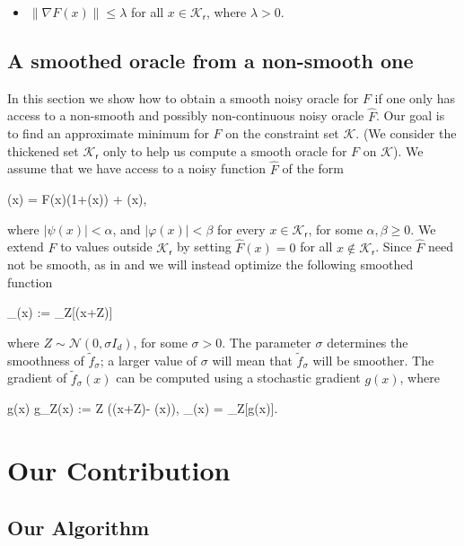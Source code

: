 \documentclass[final,12pt]{colt2018} %
\def \be{\begin{equs}}
\def \ee{\end{equs}}
\begin{document}
{\begin{itemize}
\item $\| \nabla F(x) \| \leq \lambda $ for all $x \in \mathcal{K}_{\mathsf{r}}$, where $\lambda>0$.

%


\end{itemize}


\subsection{A smoothed oracle from a non-smooth one} \label{sec:smoothed_from_nonsmooth}

In this section we show how to obtain a smooth noisy oracle for $F$ if one only has access to a non-smooth and possibly non-continuous noisy oracle $\hat{F}$.
%
Our goal is to find an approximate minimum for $F$ on the constraint set $\mathcal{K}$. (We consider the thickened set $\mathcal{K}_{\mathsf{r}}$ only to help us compute a smooth oracle for $F$ on $\mathcal{K}$).
%
We assume that we have access to a noisy function $\hat{F}$ of the form
%
\be \label{eq:assumption}
(x) = F(x)(1+\psi(x)) + \varphi(x),
\ee
%
where $|\psi(x)|< \alpha$, and $|\varphi(x)|< \beta$ for every $x \in \mathcal{K}_{\mathsf{r}}$, for some $ \alpha, \beta \geq 0$.
%
We extend $\hat{F}$ to values outside $\mathcal{K}_{\mathsf{r}}$ by setting $\hat{F}(x) = 0$ for all $x \notin \mathcal{K}_{\mathsf{r}}$.
%
Since $\hat{F}$ need not be smooth, as in \cite{duchi2015optimal} and \cite{hitting_times} we will instead optimize the following smoothed function
%
\be \label{eq:smoother}
_\sigma(x) := _Z[(x+Z)]
\ee
%
where $Z \sim \mathcal{N}(0,\sigma I_d)$, for some $\sigma>0$.  The parameter $\sigma$ determines the smoothness of $\tilde{f}_\sigma$; a larger value of $\sigma$ will mean that $\tilde{f}_\sigma$ will be smoother. 
%
The gradient of $\tilde{f}_\sigma(x)$ can be computed using a stochastic gradient $g(x)$, where
%
\be
g(x) \equiv g_Z(x) := Z \left((x+Z)- (x)\right), \quad \quad \nabla {}_\sigma(x) = _Z[g(x)].
\ee



\section{Our Contribution}

\subsection{Our Algorithm} \label{sec:algorithm}

}
\end{document}
